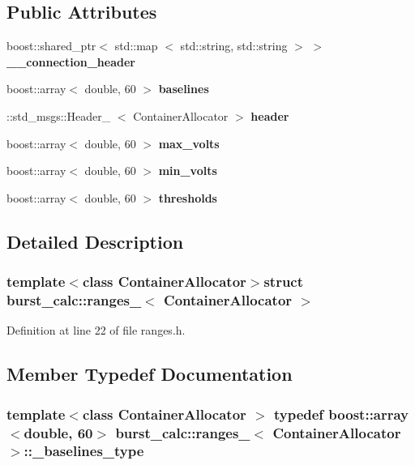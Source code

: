\subsection*{\-Public \-Attributes}
\begin{DoxyCompactItemize}
\item 
boost\-::shared\-\_\-ptr$<$ std\-::map\*
$<$ std\-::string, std\-::string $>$ $>$ {\bf \-\_\-\-\_\-connection\-\_\-header}
\item 
boost\-::array$<$ double, 60 $>$ {\bf baselines}
\item 
\-::std\-\_\-msgs\-::\-Header\-\_\-\*
$<$ \-Container\-Allocator $>$ {\bf header}
\item 
boost\-::array$<$ double, 60 $>$ {\bf max\-\_\-volts}
\item 
boost\-::array$<$ double, 60 $>$ {\bf min\-\_\-volts}
\item 
boost\-::array$<$ double, 60 $>$ {\bf thresholds}
\end{DoxyCompactItemize}


\subsection{\-Detailed \-Description}
\subsubsection*{template$<$class Container\-Allocator$>$struct burst\-\_\-calc\-::ranges\-\_\-$<$ Container\-Allocator $>$}



\-Definition at line 22 of file ranges.\-h.



\subsection{\-Member \-Typedef \-Documentation}
\subsubsection[{\-\_\-baselines\-\_\-type}]{\setlength{\rightskip}{0pt plus 5cm}template$<$class Container\-Allocator $>$ typedef boost\-::array$<$double, 60$>$ {\bf burst\-\_\-calc\-::ranges\-\_\-}$<$ \-Container\-Allocator $>$\-::{\bf \-\_\-baselines\-\_\-type}}\label{structburst__calc_1_1ranges___a94938e2a11fa185a04d13824ee6585ef}


